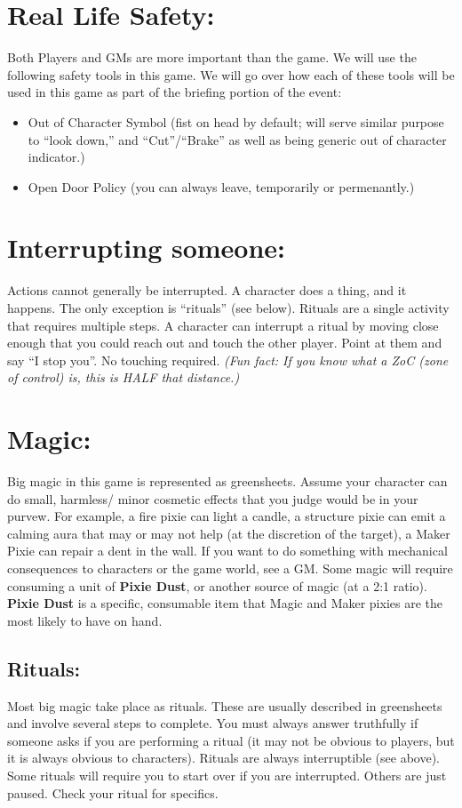 \documentclass[sheet]{PP}
\begin{document}

\section*{Real Life Safety:}
Both Players and GMs are more important than the game. We will use the following safety tools in this game. We will go over how each of these tools will be used in this game as part of the briefing portion of the event: 
\begin{itemize}
  \item Out of Character Symbol (fist on head by default; will serve similar purpose to ``look down,'' and ``Cut''/``Brake'' as well as being generic out of character indicator.)
  \item Open Door Policy (you can always leave, temporarily or permenantly.)
\end{itemize}

\section*{Interrupting someone:}
Actions cannot generally be interrupted. A character does a thing, and it happens. The only exception is ``rituals'' (see below). Rituals are a single activity that requires multiple steps. A character can interrupt a ritual by moving close enough that you could reach out and touch the other player. Point at them and say ``I stop you''. No touching required. \textit{(Fun fact: If you know what a ZoC (zone of control) is, this is HALF that distance.)}

\section*{Magic:}
Big magic in this game is represented as greensheets. Assume your character can do small, harmless/ minor cosmetic effects that you judge would be in your purvew. For example, a fire pixie can light a candle, a structure pixie can emit a calming aura that may or may not help (at the discretion of the target), a Maker Pixie can repair a dent in the wall. If you want to do something with mechanical consequences to characters or the game world, see a GM. Some magic will require consuming a unit of \textbf{Pixie Dust}, or another source of magic (at a 2:1 ratio). \textbf{Pixie Dust} is a specific, consumable item that Magic and Maker pixies are the most likely to have on hand.

\subsection*{Rituals:}
Most big magic take place as rituals. These are usually described in greensheets and involve several steps to complete. You must always answer truthfully if someone asks if you are performing a ritual (it may not be obvious to players, but it is always obvious to characters). Rituals are always interruptible (see above). Some rituals will require you to start over if you are interrupted. Others are just paused. Check your ritual for specifics.
\end{document}
